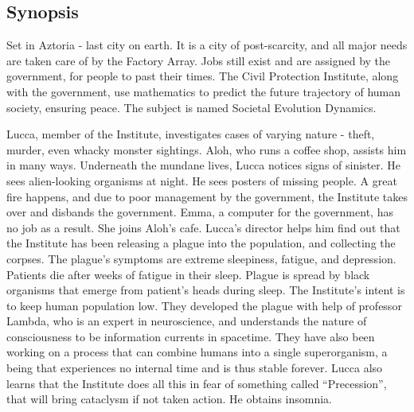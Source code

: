 \documentclass[11pt]{article}
\begin{document}
	\subsection{Synopsis}
	Set in Aztoria - last city on earth. 
	It is a city of post-scarcity, and all major needs are taken care of by the Factory Array.
	Jobs still exist and are assigned by the government, for people to past their times.
	The Civil Protection Institute, along with the government, use mathematics to predict the future trajectory of human society, ensuring peace.
	The subject is named Societal Evolution Dynamics.
	
	Lucca, member of the Institute, investigates cases of varying nature - theft, murder, even whacky monster sightings.
	Aloh, who runs a coffee shop, assists him in many ways.
	Underneath the mundane lives, Lucca notices signs of sinister. 
	He sees alien-looking organisms at night. 
	He sees posters of missing people. 
	A great fire happens, and due to poor management by the government, the Institute takes over and disbands the government. 
	Emma, a computer for the government, has no job as a result.
	She joins Aloh's cafe.
	Lucca's director helps him find out that the Institute has been releasing a plague into the population, and collecting the corpses. 
	The plague's symptoms are extreme sleepiness, fatigue, and depression.
	Patients die after weeks of fatigue in their sleep.
	Plague is spread by black organisms that emerge from patient's heads during sleep.
	The Institute's intent is to keep human population low. 
	They developed the plague with help of professor Lambda, who is an expert in neuroscience, and understands the nature of consciousness to be information currents in spacetime.
	They have also been working on a process that can combine humans into a single superorganism, a being that experiences no internal time and is thus stable forever.
	Lucca also learns that the Institute does all this in fear of something called ``Precession'', that will bring cataclysm if not taken action.
	He obtains insomnia.
	
\end{document}
